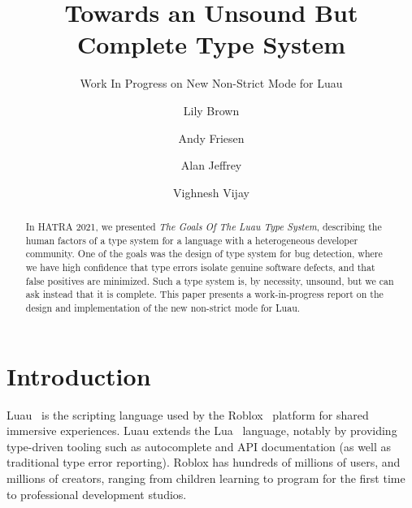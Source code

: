 \documentclass[sigplan]{acmart}
\begin{document}
\title{Towards an Unsound But Complete Type System}
\subtitle{Work In Progress on New Non-Strict Mode for Luau}

\author{Lily Brown}
\author{Andy Friesen}
\author{Alan Jeffrey}
\author{Vighnesh Vijay}

\begin{abstract}
In HATRA 2021, we presented \emph{The Goals Of The Luau Type System},
describing the human factors of a type system for a language with a
heterogeneous developer community.  One of the goals was the design of
type system for bug detection, where we have high confidence that type
errors isolate genuine software defects, and that false positives are
minimized. Such a type system is, by necessity, unsound, but we can ask
instead that it is complete. This paper presents a work-in-progress report
on the design and implementation of the new non-strict mode for Luau.
\end{abstract}

\maketitle

\section{Introduction}

Luau~\cite{Luau} is the scripting language used by the
Roblox~\cite{Roblox} platform for shared immersive experiences.  Luau extends
the Lua~\cite{Lua} language, notably by providing type-driven tooling
such as autocomplete and API documentation (as well as traditional type
error reporting). Roblox has hundreds of millions of users, and
millions of creators, ranging from children learning to program for
the first time to professional development studios.
\end{document}

